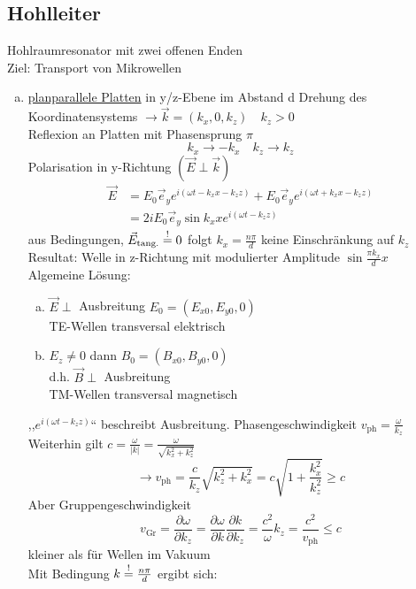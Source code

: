 \documentclass[titlepage,12pt,a4paper,ngerman]{report}
\newcommand{\tx}[1]{\textrm{#1}}
\begin{document}
\subsection{Hohlleiter}
Hohlraumresonator mit zwei offenen Enden\\
Ziel: Transport von Mikrowellen
\begin{enumerate}[a)]
	\item \underline{planparallele Platten} in y/z-Ebene im Abstand d
	Drehung des Koordinatensystems $ \rightarrow \vec{k} = (k_x,0,k_z) \quad k_z > 0 $\\
	Reflexion an Platten mit Phasensprung $ \pi $
	$$k_x \rightarrow - k_x \quad k_z \rightarrow k_z$$
	Polarisation in y-Richtung $ (\vec{E} \perp \vec{k}) $
	\begin{align*}
	\vec{E} &= E_0 \vec{e}_y e^{i(\omega t - k_x x - k_z z)} + E_0 \vec{e}_y e^{i(\omega t + k_x x - k_z z)}\\
	&= 2 i E_0 \vec{e}_y \sin k_x x e^{i(\omega t - k_z z)}
	\end{align*}
	aus Bedingungen, $ \vec{E}_{\tx{tang.}} \buildrel ! \over = 0 $ folgt $ k_x = \frac{n \pi}{d} $ keine Einschränkung auf $ k_z $\\[5pt]
	Resultat: Welle in z-Richtung mit modulierter Amplitude $ \sin \frac{\pi k_x}{d} x $\\[5pt]
	Algemeine Lösung:
	\begin{enumerate}[a)]
		\item $ \vec{E}\perp $ Ausbreitung $ E_0 = (E_{x0},E_{y0},0) $\\
		TE-Wellen transversal elektrisch
		\item $ E_z \neq 0 $ dann $ B_0 = (B_{x0},B_{y0},0) $\\
		d.h. $ \vec{B} \perp $ Ausbreitung\\
		TM-Wellen transversal magnetisch
	\end{enumerate}
	,,$ e^{i(\omega t - k_z z)} $`` beschreibt Ausbreitung. Phasengeschwindigkeit $ v_{\tx{ph}} = \frac{\omega}{k_z} $\\
	Weiterhin gilt $ c = \frac{\omega}{|k|} = \frac{\omega}{\sqrt{k_x^2 + k_z^2}} $
	$$\rightarrow v_{\tx{ph}} = \frac{c}{k_z} \sqrt{k_z^2 + k_x^2} = c \sqrt{1+\frac{k_x^2}{k_z^2}} \ge c$$
	Aber Gruppengeschwindigkeit
	$$v_{\tx{Gr}} = \frac{\partial \omega}{\partial k_z} = \frac{\partial \omega}{\partial k} \frac{\partial k}{\partial k_z} = \frac{c^2}{\omega} k_z = \frac{c^2}{v_{\tx{ph}}} \le c$$
	kleiner als für Wellen im Vakuum\\
	Mit Bedingung $ k \buildrel ! \over = \frac{n \pi }{d} $ ergibt sich:

\end{enumerate}
\end{document}
